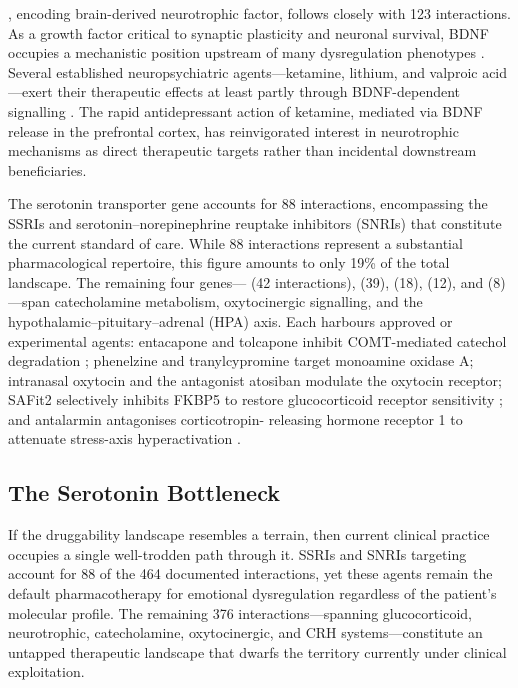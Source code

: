, encoding brain-derived neurotrophic factor, follows closely with
123 interactions. As a growth factor critical to synaptic plasticity and
neuronal survival, BDNF occupies a mechanistic position upstream of many
dysregulation phenotypes \cite{martinowich2007}. Several established
neuropsychiatric agents---ketamine, lithium, and valproic acid---exert their
therapeutic effects at least partly through BDNF-dependent signalling
\cite{duman2012}. The rapid antidepressant action of ketamine, mediated via
BDNF release in the prefrontal cortex, has reinvigorated interest in
neurotrophic mechanisms as direct therapeutic targets rather than incidental
downstream beneficiaries.

The serotonin transporter gene  accounts for 88 interactions,
encompassing the SSRIs and serotonin--norepinephrine reuptake inhibitors
(SNRIs) that constitute the current standard of care. While 88 interactions
represent a substantial pharmacological repertoire, this figure amounts to only
19\% of the total landscape. The remaining four genes--- (42
interactions),  (39),  (18),  (12), and
 (8)---span catecholamine metabolism, oxytocinergic signalling, and
the hypothalamic--pituitary--adrenal (HPA) axis. Each harbours approved or
experimental agents: entacapone and tolcapone inhibit COMT-mediated catechol
degradation \cite{kiss2010}; phenelzine and tranylcypromine target monoamine
oxidase A; intranasal oxytocin and the antagonist atosiban modulate the
oxytocin receptor; SAFit2 selectively inhibits FKBP5 to restore glucocorticoid
receptor sensitivity \cite{gaali2015}; and antalarmin antagonises corticotropin-
releasing hormone receptor 1 to attenuate stress-axis hyperactivation
\cite{zorrilla2002}.

\subsection*{The Serotonin Bottleneck}

If the druggability landscape resembles a terrain, then current clinical
practice occupies a single well-trodden path through it. SSRIs and SNRIs
targeting  account for 88 of the 464 documented interactions, yet
these agents remain the default pharmacotherapy for emotional dysregulation
regardless of the patient's molecular profile. The remaining 376
interactions---spanning glucocorticoid, neurotrophic, catecholamine,
oxytocinergic, and CRH systems---constitute an untapped therapeutic landscape
that dwarfs the territory currently under clinical exploitation.


